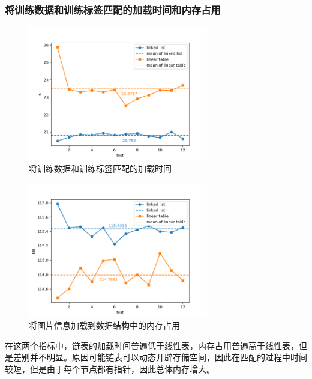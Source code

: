 \subsubsection{将训练数据和训练标签匹配的加载时间和内存占用}
\begin{figure}[H]
	\centering
	\includegraphics[width=0.7\textwidth]{time2}  %
	\caption{将训练数据和训练标签匹配的加载时间}
	\label{fig:your_label}
\end{figure}
\begin{figure}[H]
	\centering
	\includegraphics[width=0.7\textwidth]{memory2}  %
	\caption{将图片信息加载到数据结构中的内存占用}
	\label{fig:your_label}
\end{figure}
在这两个指标中，链表的加载时间普遍低于线性表，内存占用普遍高于线性表，但是差别并不明显。原因可能链表可以动态开辟存储空间，因此在匹配的过程中时间较短，但是由于每个节点都有指针，因此总体内存增大。
